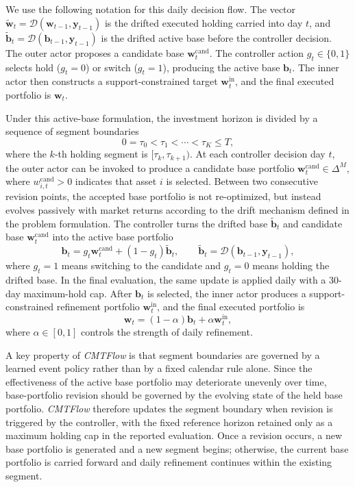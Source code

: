 \documentclass[letterpaper]{article} %
\begin{document}
We use the following notation for this daily decision flow. The vector \(\tilde{\mathbf{w}}_t=\mathcal{D}(\mathbf{w}_{t-1},\mathbf{y}_{t-1})\) is the drifted executed holding carried into day \(t\), and \(\tilde{\mathbf{b}}_t=\mathcal{D}(\mathbf{b}_{t-1},\mathbf{y}_{t-1})\) is the drifted active base before the controller decision. The outer actor proposes a candidate base \(\mathbf{w}_t^{\mathrm{cand}}\). The controller action \(g_t\in\{0,1\}\) selects hold (\(g_t=0\)) or switch (\(g_t=1\)), producing the active base \(\mathbf{b}_t\). The inner actor then constructs a support-constrained target \(\mathbf{w}_t^{\mathrm{in}}\), and the final executed portfolio is \(\mathbf{w}_t\).

Under this active-base formulation, the investment horizon is divided by a sequence of segment boundaries
\[
0=\tau_0<\tau_1<\cdots<\tau_K\le T,
\]
where the \(k\)-th holding segment is \([\tau_k,\tau_{k+1})\). At each controller decision day \(t\), the outer actor can be invoked to produce a candidate base portfolio \(\mathbf{w}_{t}^{\mathrm{cand}}\in\Delta^M\), where \(w_{i,t}^{\mathrm{cand}}>0\) indicates that asset \(i\) is selected. Between two consecutive revision points, the accepted base portfolio is not re-optimized, but instead evolves passively with market returns according to the drift mechanism defined in the problem formulation. The controller turns the drifted base \(\tilde{\mathbf{b}}_t\) and candidate base \(\mathbf{w}_t^{\mathrm{cand}}\) into the active base portfolio
\[
\mathbf{b}_t
=
g_t\mathbf{w}_t^{\mathrm{cand}}+(1-g_t)\tilde{\mathbf{b}}_t,
\qquad
\tilde{\mathbf{b}}_t=\mathcal{D}(\mathbf{b}_{t-1},\mathbf{y}_{t-1}),
\]
where \(g_t=1\) means switching to the candidate and \(g_t=0\) means holding the drifted base. In the final evaluation, the same update is applied daily with a 30-day maximum-hold cap. After \(\mathbf{b}_t\) is selected, the inner actor produces a support-constrained refinement portfolio \(\mathbf{w}_t^{\mathrm{in}}\), and the final executed portfolio is
\[
\mathbf{w}_t=(1-\alpha)\mathbf{b}_t+\alpha\mathbf{w}_t^{\mathrm{in}},
\]
where \(\alpha\in[0,1]\) controls the strength of daily refinement.

A key property of \textit{CMTFlow} is that segment boundaries are governed by a learned event policy rather than by a fixed calendar rule alone. Since the effectiveness of the active base portfolio may deteriorate unevenly over time, base-portfolio revision should be governed by the evolving state of the held base portfolio. \textit{CMTFlow} therefore updates the segment boundary when revision is triggered by the controller, with the fixed reference horizon retained only as a maximum holding cap in the reported evaluation. Once a revision occurs, a new base portfolio is generated and a new segment begins; otherwise, the current base portfolio is carried forward and daily refinement continues within the existing segment.
\end{document}
